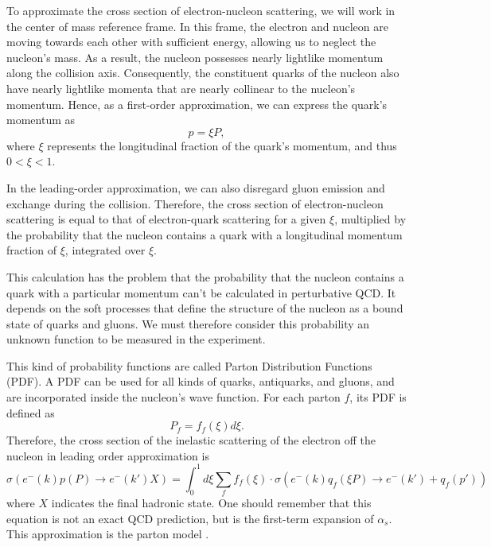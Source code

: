     To approximate the cross section of electron-nucleon scattering, we will work in the center of mass reference frame.
    In this frame, the electron and nucleon are moving towards each other with sufficient energy, allowing us to neglect the nucleon's mass.
    As a result, the nucleon possesses nearly lightlike momentum along the collision axis.
    Consequently, the constituent quarks of the nucleon also have nearly lightlike momenta that are nearly collinear to the nucleon's momentum.
    Hence, as a first-order approximation, we can express the quark's momentum as
    \begin{equation*}
        p = \xi P,
    \end{equation*}
    where $\xi$ represents the longitudinal fraction of the quark's momentum, and thus $0 < \xi < 1$.

    In the leading-order approximation, we can also disregard gluon emission and exchange during the collision.
    Therefore, the cross section of electron-nucleon scattering is equal to that of electron-quark scattering for a given $\xi$, multiplied by the probability that the nucleon contains a quark with a longitudinal momentum fraction of $\xi$, integrated over $\xi$.

    This calculation has the problem that the probability that the nucleon contains a quark with a particular momentum can't be calculated in perturbative QCD.
    It depends on the soft processes that define the structure of the nucleon as a bound state of quarks and gluons.
    We must therefore consider this probability an unknown function to be measured in the experiment.

    This kind of probability functions are called Parton Distribution Functions (PDF).
    A PDF can be used for all kinds of quarks, antiquarks, and gluons, and are incorporated inside the nucleon's wave function.
    For each parton $f$, its PDF is defined as
    \begin{equation*}
        P_f = f_f(\xi)d\xi.
    \end{equation*}
    Therefore, the cross section of the inelastic scattering of the electron off the nucleon in leading order approximation is
    \begin{equation*}
        \sigma\left( e^-(k) p(P) \rightarrow e^-(k') X \right) =
                \int_0^1d\xi \sum_f f_f(\xi) \cdot
                \sigma\left( e^-(k) q_f(\xi P) \rightarrow e^-(k') + q_f(p') \right)
    \end{equation*}
    where $X$ indicates the final hadronic state.
    One should remember that this equation is not an exact QCD prediction, but is the first-term expansion of $\alpha_s$.
    This approximation is the parton model \cite{halzen1991}.

